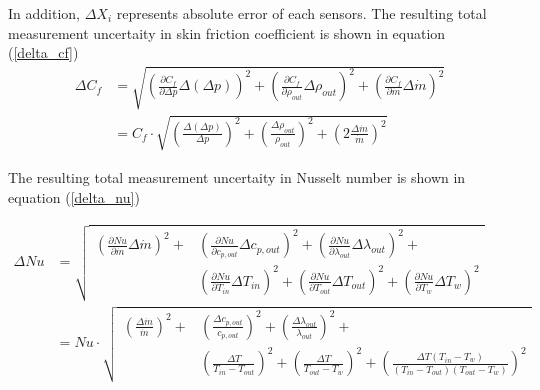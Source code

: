 \documentclass[12pt,oneside]{jbook}
\begin{document}
In addition, $\Delta X_{i}$ represents absolute error of each sensors.
The resulting total measurement uncertaity in skin friction coefficient is shown in equation (\ref{delta_cf})
\begin{align}
    \Delta C_{f} & = \sqrt{\left(\frac{\partial C_{f}}{\partial \Delta p}\Delta \left( \Delta p \right) \right)^{2} + \left(\frac{\partial C_{f}}{\partial \rho_{out}}\Delta \rho_{out} \right)^{2} + \left(\frac{\partial C_{f}}{\partial \dot{m}}\Delta \dot{m} \right)^{2}}\\
    & = C_{f} \cdot \sqrt{\left( \frac{\Delta \left(\Delta p \right)}{\Delta p}\right)^{2} + \left(\frac{\Delta \rho_{out}}{\rho_{out}}\right)^{2} + \left( 2 \frac{\Delta \dot{m}}{\dot{m}}\right)^{2}}
    \label{delta_cf}
\end{align}

The resulting total measurement uncertaity in Nusselt number is shown in equation (\ref{delta_nu})

\begin{align}
    \Delta Nu & =
    \sqrt{
        \begin{aligned}
        \left(\frac{\partial Nu}{\partial \dot{m}}\Delta \dot{m}\right)^{2} + & \left(\frac{\partial Nu}{\partial c_{p,out}}\Delta c_{p,out}\right)^{2} + \left(\frac{\partial Nu}{\partial \lambda_{out}}\Delta \lambda_{out}\right)^{2} +\\
        & \left(\frac{\partial Nu}{\partial T_{in}}\Delta T_{in}\right)^{2}
        + \left(\frac{\partial Nu}{\partial T_{out}}\Delta T_{out}\right)^{2}
        + \left(\frac{\partial Nu}{\partial T_{w}}\Delta T_{w}\right)^{2}
        \end{aligned}
    }\\
    & = Nu \cdot \sqrt{
        \begin{aligned}
        \left(\frac{\Delta \dot{m}}{\dot{m}}\right)^{2}
        + & \left(\frac{\Delta c_{p,out}}{c_{p,out}}\right)^{2}
        + \left(\frac{\Delta \lambda_{out}}{\lambda_{out}}\right)^{2}+\\
        & \left(\frac{\Delta T}{T_{in} - T_{out}}\right)^{2}
        + \left(\frac{\Delta T}{T_{out} - T_{w}}\right)^{2}
        + \left(\frac{\Delta T\left( T_{in} - T_{w}\right)}{\left( T_{in} - T_{out}\right)\left( T_{out}-T_{w} \right)} \right)^{2}
        \end{aligned}
        }
\end{align}
\end{document}
